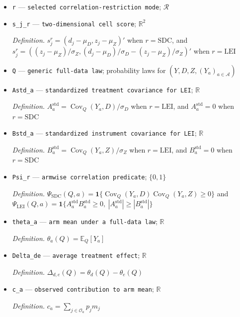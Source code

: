 \documentclass{article}
\begin{document}
\begin{itemize}
  \item \texttt{r} --- \texttt{selected correlation-\allowbreak{}restriction mode}; \(\mathcal R\)
  \item \texttt{s\_\allowbreak{}j\_\allowbreak{}r} --- \texttt{two-\allowbreak{}dimensional cell score}; \(\mathbb R^2\)
  \par\smallskip\noindent\emph{Definition.} \(s_j^r=(d_j-\mu_D,z_j-\mu_Z)'\) when \(r=\mathrm{SDC}\), and \(s_j^r=((z_j-\mu_Z)/\sigma_Z,(d_j-\mu_D)/\sigma_D-(z_j-\mu_Z)/\sigma_Z)'\) when \(r=\mathrm{LEI}\)
  \item \texttt{Q} --- \texttt{generic full-\allowbreak{}data law}; probability laws for \((Y,D,Z,(Y_a)_{a\in\mathcal A})\)
  \item \texttt{Astd\_\allowbreak{}a} --- \texttt{standardized treatment covariance for LEI}; \(\mathbb R\)
  \par\smallskip\noindent\emph{Definition.} \(A_a^{\mathrm{std}}=\operatorname{Cov}_Q(Y_a,D)/\sigma_D\) when \(r=\mathrm{LEI}\), and \(A_a^{\mathrm{std}}=0\) when \(r=\mathrm{SDC}\)
  \item \texttt{Bstd\_\allowbreak{}a} --- \texttt{standardized instrument covariance for LEI}; \(\mathbb R\)
  \par\smallskip\noindent\emph{Definition.} \(B_a^{\mathrm{std}}=\operatorname{Cov}_Q(Y_a,Z)/\sigma_Z\) when \(r=\mathrm{LEI}\), and \(B_a^{\mathrm{std}}=0\) when \(r=\mathrm{SDC}\)
  \item \texttt{Psi\_\allowbreak{}r} --- \texttt{armwise correlation predicate}; \(\{0,1\}\)
  \par\smallskip\noindent\emph{Definition.} \(\Psi_{\mathrm{SDC}}(Q,a)=\mathbf 1\{\operatorname{Cov}_Q(Y_a,D)\operatorname{Cov}_Q(Y_a,Z)\ge0\}\) and \(\Psi_{\mathrm{LEI}}(Q,a)=\mathbf 1\{A_a^{\mathrm{std}}B_a^{\mathrm{std}}\ge0,\ |A_a^{\mathrm{std}}|\ge|B_a^{\mathrm{std}}|\}\)
  \item \texttt{theta\_\allowbreak{}a} --- \texttt{arm mean under a full-\allowbreak{}data law}; \(\mathbb R\)
  \par\smallskip\noindent\emph{Definition.} \(\theta_a(Q)=\mathbb E_Q[Y_a]\)
  \item \texttt{Delta\_\allowbreak{}de} --- \texttt{average treatment effect}; \(\mathbb R\)
  \par\smallskip\noindent\emph{Definition.} \(\Delta_{d,e}(Q)=\theta_d(Q)-\theta_e(Q)\)
  \item \texttt{c\_\allowbreak{}a} --- \texttt{observed contribution to arm mean}; \(\mathbb R\)
  \par\smallskip\noindent\emph{Definition.} \(c_a=\sum_{j\in\mathcal O_a}p_jm_j\)

\end{itemize}
\end{document}
